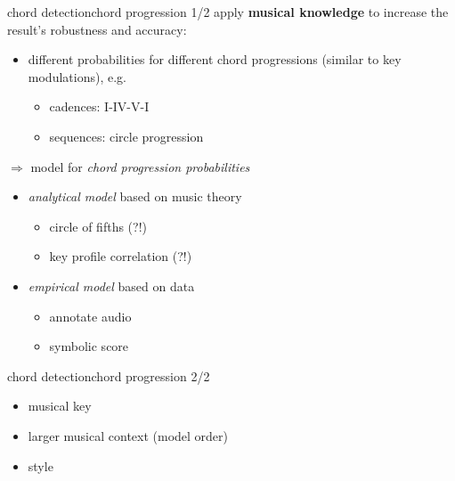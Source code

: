         \begin{frame}{chord detection}{chord progression 1/2}
            apply \textbf{musical knowledge} to increase the result's robustness and accuracy:
            
            \begin{itemize}
                \item	different probabilities for different chord progressions (similar to key modulations), e.g.
                \begin{itemize}
                    \item	cadences: I-IV-V-I
                    \item	sequences: circle progression
                    
                \end{itemize}
            \end{itemize}

            $\Rightarrow$ model for \textit{chord progression probabilities}
            \begin{itemize}
                \item<2->	\textit{analytical model} based on music theory
                    \begin{itemize}
                        \item	circle of fifths (?!)
                        \item	key profile correlation (?!)
                    \end{itemize}
                \item<3->	\textit{empirical model} based on data
                    \begin{itemize}	
                        \item	annotate audio
                        \item	symbolic score
                    \end{itemize}
            \end{itemize}
        \end{frame}
        \begin{frame}{chord detection}{chord progression 2/2}

            \begin{itemize}
                \item 	musical key
                \item<3->	larger musical context (model order)
                \item<4->	style
            \end{itemize}
        \end{frame}
        
